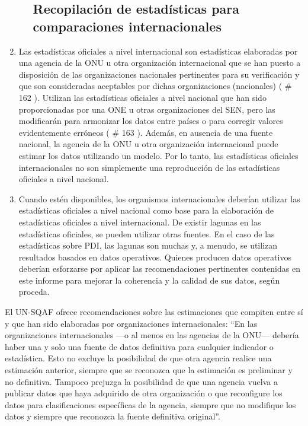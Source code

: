 \documentclass[
]{book}
\begin{document}
\begin{enumerate}
\begin{enumerate}
{    \subsection{Recopilación de estadísticas para comparaciones internacionales}\label{recopilaciuxf3n-de-estaduxedsticas-para-comparaciones-internacionales}}
  \end{enumerate}
\item
  Las estadísticas oficiales a nivel internacional son estadísticas elaboradas por una agencia de la ONU u otra organización internacional que se han puesto a disposición de las organizaciones nacionales pertinentes para su verificación y que son consideradas aceptables por dichas organizaciones (nacionales) (
  \# 162
  ). Utilizan las estadísticas oficiales a nivel nacional que han sido proporcionadas por una ONE u otras organizaciones del SEN, pero las modificarán para armonizar los datos entre países o para corregir valores evidentemente erróneos (
  \# 163
  ). Además, en ausencia de una fuente nacional, la agencia de la ONU u otra organización internacional puede estimar los datos utilizando un modelo. Por lo tanto, las estadísticas oficiales internacionales no son simplemente una reproducción de las estadísticas oficiales a nivel nacional.
\item
  Cuando estén disponibles, los organismos internacionales deberían utilizar las estadísticas oficiales a nivel nacional como base para la elaboración de estadísticas oficiales a nivel internacional. De existir lagunas en las estadísticas oficiales, se pueden utilizar otras fuentes. En el caso de las estadísticas sobre PDI, las lagunas son muchas y, a menudo, se utilizan resultados basados en datos operativos. Quienes producen datos operativos deberían esforzarse por aplicar las recomendaciones pertinentes contenidas en este informe para mejorar la coherencia y la calidad de sus datos, según proceda.
\end{enumerate}

El UN-SQAF ofrece recomendaciones sobre las estimaciones que compiten entre sí y que han sido elaboradas por organizaciones internacionales: ``En las organizaciones internacionales ---o al menos en las agencias de la ONU--- debería haber una y solo una fuente de datos definitiva para cualquier indicador o estadística. Esto no excluye la posibilidad de que otra agencia realice una estimación anterior, siempre que se reconozca que la estimación es preliminar y no definitiva. Tampoco prejuzga la posibilidad de que una agencia vuelva a publicar datos que haya adquirido de otra organización o que reconfigure los datos para clasificaciones específicas de la agencia, siempre que no modifique los datos y siempre que reconozca la fuente definitiva original''.
\end{document}
